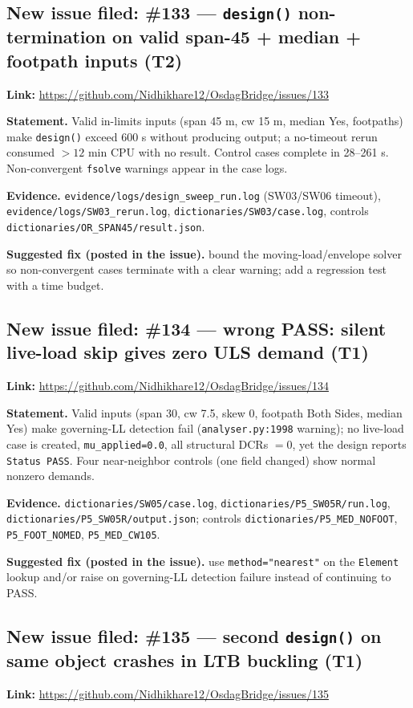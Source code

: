 \documentclass[11pt,a4paper]{article}
\begin{document}
\subsection{New issue filed: \#133 --- \texttt{design()} non-termination on valid span-45 + median + footpath inputs (T2)}
\textbf{Link:} \url{https://github.com/Nidhikhare12/OsdagBridge/issues/133}

\textbf{Statement.} Valid in-limits inputs (span 45 m, cw 15 m, median Yes, footpaths) make \texttt{design()} exceed 600 s without producing output; a no-timeout rerun consumed $>12$ min CPU with no result. Control cases complete in 28--261 s. Non-convergent \texttt{fsolve} warnings appear in the case logs.

\textbf{Evidence.} \texttt{evidence/logs/design\_sweep\_run.log} (SW03/SW06 timeout), \texttt{evidence/logs/SW03\_rerun.log}, \texttt{dictionaries/SW03/case.log}, controls \texttt{dictionaries/OR\_SPAN45/result.json}.

\textbf{Suggested fix (posted in the issue).} bound the moving-load/envelope solver so non-convergent cases terminate with a clear warning; add a regression test with a time budget.

\subsection{New issue filed: \#134 --- wrong PASS: silent live-load skip gives zero ULS demand (T1)}
\textbf{Link:} \url{https://github.com/Nidhikhare12/OsdagBridge/issues/134}

\textbf{Statement.} Valid inputs (span 30, cw 7.5, skew 0, footpath Both Sides, median Yes) make governing-LL detection fail (\texttt{analyser.py:1998} warning); no live-load case is created, \texttt{mu\_applied=0.0}, all structural DCRs $=0$, yet the design reports \texttt{Status PASS}. Four near-neighbor controls (one field changed) show normal nonzero demands.

\textbf{Evidence.} \texttt{dictionaries/SW05/case.log}, \texttt{dictionaries/P5\_SW05R/run.log}, \texttt{dictionaries/P5\_SW05R/output.json}; controls \texttt{dictionaries/P5\_MED\_NOFOOT}, \texttt{P5\_FOOT\_NOMED}, \texttt{P5\_MED\_CW105}.

\textbf{Suggested fix (posted in the issue).} use \texttt{method="nearest"} on the \texttt{Element} lookup and/or raise on governing-LL detection failure instead of continuing to PASS.

\subsection{New issue filed: \#135 --- second \texttt{design()} on same object crashes in LTB buckling (T1)}
\textbf{Link:} \url{https://github.com/Nidhikhare12/OsdagBridge/issues/135}
\end{document}
